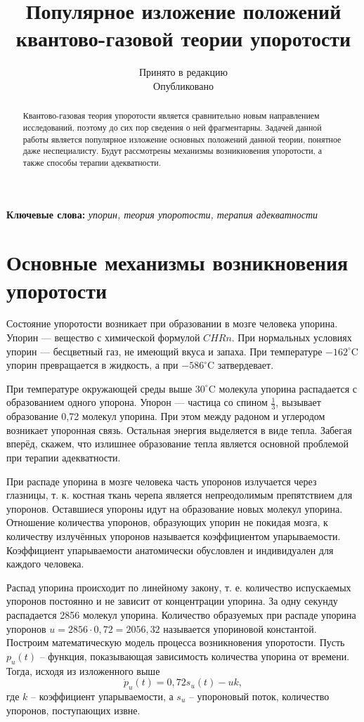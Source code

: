 \documentclass[a4paper,12pt]{article}
\title{Популярное изложение положений квантово-газовой теории упоротости}
\author{\articleauthor}
\date{Принято в редакцию \datereceived \\ Опубликовано \dateaccepted}
\begin{document}
\maketitle

\begin{abstract}
Квантово-газовая теория упоротости является сравнительно новым направлением исследований, поэтому до сих пор сведения о ней фрагментарны. Задачей данной работы является популярное изложение основных положений данной теории, понятное даже неспециалисту. Будут рассмотрены механизмы возникновения упоротости, а также способы терапии адекватности.
\end{abstract}

\textbf{Ключевые слова:} \textit{упорин, теория упоротости, терапия адекватности}




\section{Основные механизмы возникновения упоротости}

Состояние упоротости возникает при образовании в мозге человека упорина. Упорин — вещество с химической формулой $CHRn$. При нормальных условиях упорин — бесцветный газ, не имеющий вкуса и запаха. При температуре $-162^\circ$C упорин превращается в жидкость, а при $-586^\circ$C затвердевает.

При температуре окружающей среды выше $30^\circ$C молекула упорина распадается с образованием одного упорона. Упорон — частица со спином $\frac{1}{3}$, вызывает образование 0,72 молекул упорина. При этом между радоном и углеродом возникает упоронная связь. Остальная энергия выделяется в виде тепла. Забегая вперёд, скажем, что излишнее образование тепла является основной проблемой при терапии адекватности.

При распаде упорина в мозге человека часть упоронов излучается через глазницы, т. к. костная ткань черепа является непреодолимым препятствием для упоронов. Оставшиеся упороны идут на образование новых молекул упорина. Отношение количества упоронов, образующих упорин не покидая мозга, к количеству излучённых упоронов называется коэффициентом упарываемости. Коэффициент упарываемости анатомически обусловлен и индивидуален для каждого человека.

Распад упорина происходит по линейному закону, т. е. количество испускаемых упоронов постоянно и не зависит от концентрации упорина. За одну секунду распадается 2856 молекул упорина. Количество образуемых при распаде упорина упоронов $u=2856\cdot 0,72=2056,32$ называется упориновой константой. Построим математическую модель процесса возникновения упоротости. Пусть $p_{u}(t)$ -- функция, показывающая зависимость количества упорина от времени. Тогда, исходя из изложенного выше
\begin{equation}
\dot{p}_{u}(t)=0,72s_{u}(t)-uk,
\end{equation}
где $k$ -- коэффициент упарываемости, а $s_{u}$ -- упороновый поток, количество упоронов, поступающих извне.
\end{document}
